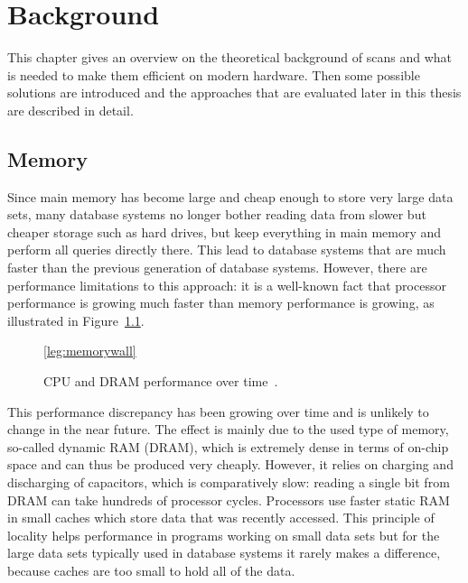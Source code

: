 \chapter{Background}

This chapter gives an overview on the theoretical background of scans and what
is needed to make them efficient on modern hardware. Then some possible
solutions are introduced and the approaches that are evaluated later in this
thesis are described in detail.

\section{Memory}

Since main memory has become large and cheap enough to store very large data
sets, many database systems no longer bother reading data from slower but
cheaper storage such as hard drives, but keep everything in main memory and
perform all queries directly there. This lead to database systems that are much
faster than the previous generation of database systems. However, there are
performance limitations to this approach: it is a well-known fact that processor
performance is growing much faster than memory performance is growing, as
illustrated in Figure~\ref{fig:memorywall}.

\begin{figure}[h] \begin{center}
\ref*{leg:memorywall}
\end{center}
\caption{CPU and DRAM performance over time~\cite{hennessyarch}.}
\label{fig:memorywall}
\end{figure}

This performance discrepancy has been growing over time and is unlikely to
change in the near future. The effect is mainly due to the used type of memory,
so-called dynamic RAM (DRAM), which is extremely dense in terms of on-chip space
and can thus be produced very cheaply. However, it relies on charging and
discharging of capacitors, which is comparatively slow: reading a single bit from
DRAM can take hundreds of processor cycles. Processors use faster static RAM in
small caches which store data that was recently accessed. This principle of
locality helps performance in programs working on small data sets but for the
large data sets typically used in database systems it rarely makes a difference,
because caches are too small to hold all of the data.

